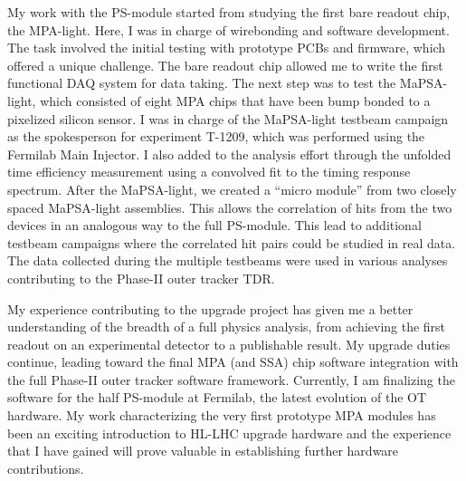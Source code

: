 \documentclass[12pt]{article}
\begin{document}
My work with the PS-module started from studying the first bare readout chip, the MPA-light.
Here, I was in charge of wirebonding and software development.
The task involved the initial testing with prototype PCBs and firmware, which offered a unique challenge.
The bare readout chip allowed me to
write the first functional DAQ system for data taking.
The next step was to test the MaPSA-light, which consisted of eight MPA chips
that have been bump bonded to a pixelized silicon sensor.
I was in charge of the MaPSA-light testbeam campaign as the spokesperson
for experiment T-1209, which was performed using the Fermilab Main Injector.
I also added to
the analysis effort through the unfolded time efficiency measurement using a convolved
fit to the timing response spectrum.
After the MaPSA-light, we created a ``micro module'' from two closely spaced MaPSA-light
assemblies.  This allows the correlation of hits from the two devices in an analogous
way to the full PS-module.  This lead to additional testbeam campaigns where
the correlated hit pairs could be studied in real data.
The data collected during the multiple testbeams were
used in various analyses contributing to the Phase-II outer tracker TDR.

My experience contributing to the upgrade
project has given me a better understanding of the breadth of a full physics analysis,
from achieving the first readout on an experimental detector to a publishable result.
My upgrade duties continue, leading toward the final MPA (and SSA) chip software integration
with the full Phase-II outer tracker software framework.
Currently, I am finalizing the software for the half PS-module at Fermilab,
the latest evolution of the OT hardware.
My work characterizing
the very first prototype MPA modules has been an exciting introduction to HL-LHC
upgrade hardware and the experience that I have gained will prove valuable in
establishing further hardware contributions.
\normalem
\end{document}
